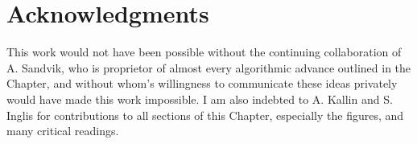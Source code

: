 \documentclass[vecphys]{svmult}
\begin{document}
\section{Acknowledgments}  
This work would not have been possible without the continuing collaboration of A. Sandvik, who is proprietor of almost every algorithmic advance outlined in the Chapter, and without whom's willingness to communicate these ideas privately would have made this work impossible.
I am also indebted to A. Kallin and S. Inglis for contributions to all sections of this Chapter, especially the figures, and many critical readings.

 
 
%
%


\printindex
\end{document}
